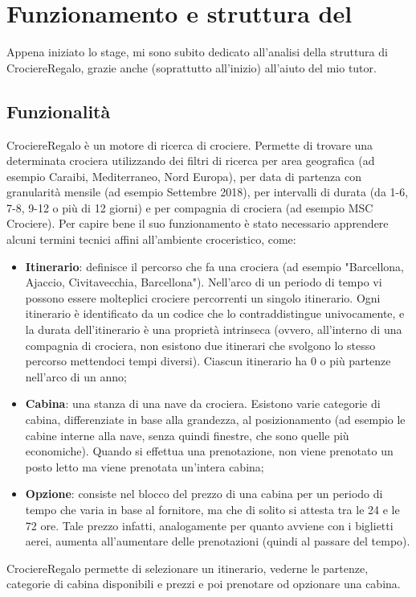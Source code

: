 \section{Funzionamento e struttura del \bookingEngine}
Appena iniziato lo stage, mi sono subito dedicato all'analisi della struttura di CrociereRegalo, grazie anche (soprattutto all'inizio) all'aiuto del mio tutor. 
\subsection{Funzionalità}
CrociereRegalo è un motore di ricerca di crociere. Permette di trovare una determinata crociera utilizzando dei filtri di ricerca per area geografica (ad esempio Caraibi, Mediterraneo, Nord Europa), per data di partenza con granularità mensile (ad esempio Settembre 2018), per intervalli di durata (da 1-6, 7-8, 9-12 o più di 12 giorni) e per compagnia di crociera (ad esempio MSC Crociere). Per capire bene il suo funzionamento è stato necessario apprendere alcuni termini tecnici affini all'ambiente croceristico, come:
\begin{itemize}
	\item \textbf{Itinerario}: definisce il percorso che fa una crociera (ad esempio "Barcellona, Ajaccio, Civitavecchia, Barcellona"). Nell'arco di un periodo di tempo vi possono essere molteplici crociere percorrenti un singolo itinerario. Ogni itinerario è identificato da un codice che lo contraddistingue univocamente, e la durata dell'itinerario è una proprietà intrinseca (ovvero, all'interno di una compagnia di crociera, non esistono due itinerari che svolgono lo stesso percorso mettendoci tempi diversi). Ciascun itinerario ha 0 o più partenze nell'arco di un anno;
	\item \textbf{Cabina}: una stanza di una nave da crociera. Esistono varie categorie di cabina, differenziate in base alla grandezza, al posizionamento (ad esempio le cabine interne alla nave, senza quindi finestre, che sono quelle più economiche). Quando si effettua una prenotazione, non viene prenotato un posto letto ma viene prenotata un'intera cabina;
	\item \textbf{Opzione}: consiste nel blocco del prezzo di una cabina per un periodo di tempo che varia in base al fornitore, ma che di solito si attesta tra le 24 e le 72 ore. Tale prezzo infatti, analogamente per quanto avviene con i biglietti aerei, aumenta all'aumentare delle prenotazioni (quindi al passare del tempo).

\end{itemize}
CrociereRegalo permette di selezionare un itinerario, vederne le partenze, categorie di cabina disponibili e prezzi e poi prenotare od opzionare una cabina. 

